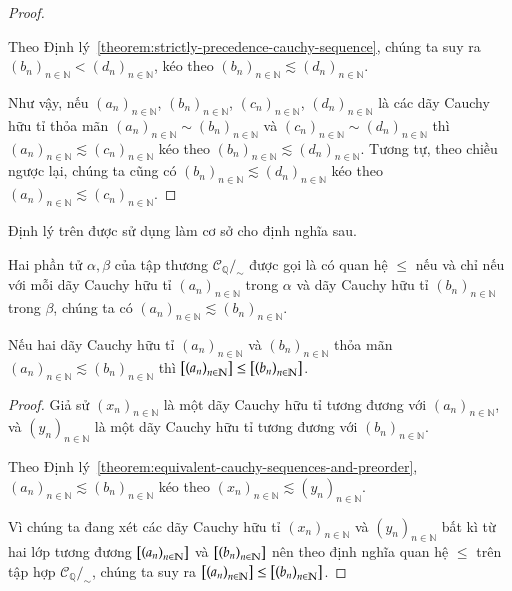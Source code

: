 \begin{proof}
\begin{enumerate}[label={\textbf{Trường hợp \arabic*.}},itemindent=2cm]
              Theo Định lý~\ref{theorem:strictly-precedence-cauchy-sequence}, chúng ta suy ra ${(b_{n})}_{n\in\mathbb{N}} < {(d_{n})}_{n\in\mathbb{N}}$, kéo theo ${(b_{n})}_{n\in\mathbb{N}}\lesssim {(d_{n})}_{n\in\mathbb{N}}$.
    \end{enumerate}

    Như vậy, nếu ${(a_{n})}_{n\in\mathbb{N}}$, ${(b_{n})}_{n\in\mathbb{N}}$, ${(c_{n})}_{n\in\mathbb{N}}$, ${(d_{n})}_{n\in\mathbb{N}}$ là các dãy Cauchy hữu tỉ thỏa mãn ${(a_{n})}_{n\in\mathbb{N}}\sim {(b_{n})}_{n\in\mathbb{N}}$ và ${(c_{n})}_{n\in\mathbb{N}}\sim {(d_{n})}_{n\in\mathbb{N}}$ thì ${(a_{n})}_{n\in\mathbb{N}}\lesssim {(c_{n})}_{n\in\mathbb{N}}$ kéo theo ${(b_{n})}_{n\in\mathbb{N}}\lesssim {(d_{n})}_{n\in\mathbb{N}}$. Tương tự, theo chiều ngược lại, chúng ta cũng có ${(b_{n})}_{n\in\mathbb{N}}\lesssim {(d_{n})}_{n\in\mathbb{N}}$ kéo theo ${(a_{n})}_{n\in\mathbb{N}}\lesssim {(c_{n})}_{n\in\mathbb{N}}$.
\end{proof}

Định lý trên được sử dụng làm cơ sở cho định nghĩa sau.
\begin{definition}
    Hai phần tử $\alpha, \beta$ của tập thương $\mathscr{C}_{\mathbb{Q}}/_{\sim}$ được gọi là có quan hệ $\leq$ nếu và chỉ nếu với mỗi dãy Cauchy hữu tỉ ${(a_{n})}_{n\in\mathbb{N}}$ trong $\alpha$ và dãy Cauchy hữu tỉ ${(b_{n})}_{n\in\mathbb{N}}$ trong $\beta$, chúng ta có ${(a_{n})}_{n\in\mathbb{N}}\lesssim {(b_{n})}_{n\in\mathbb{N}}$.
\end{definition}

\begin{theorem}\label{theorem:preorder-to-order}
    Nếu hai dãy Cauchy hữu tỉ ${(a_{n})}_{n\in\mathbb{N}}$ và ${(b_{n})}_{n\in\mathbb{N}}$ thỏa mãn ${(a_{n})}_{n\in\mathbb{N}}\lesssim {(b_{n})}_{n\in\mathbb{N}}$ thì $\left[{\left({a_{n}}\right)}_{{n}\in\mathbb{N}}\right]\leq \left[{\left({b_{n}}\right)}_{{n}\in\mathbb{N}}\right]$.
\end{theorem}

\begin{proof}
    Giả sử ${(x_{n})}_{n\in\mathbb{N}}$ là một dãy Cauchy hữu tỉ tương đương với ${(a_{n})}_{n\in\mathbb{N}}$, và ${(y_{n})}_{n\in\mathbb{N}}$ là một dãy Cauchy hữu tỉ tương đương với ${(b_{n})}_{n\in\mathbb{N}}$.

    Theo Định lý~\ref{theorem:equivalent-cauchy-sequences-and-preorder}, ${(a_{n})}_{n\in\mathbb{N}}\lesssim {(b_{n})}_{n\in\mathbb{N}}$ kéo theo ${(x_{n})}_{n\in\mathbb{N}}\lesssim {(y_{n})}_{n\in\mathbb{N}}$.

    Vì chúng ta đang xét các dãy Cauchy hữu tỉ ${(x_{n})}_{n\in\mathbb{N}}$ và ${(y_{n})}_{n\in\mathbb{N}}$ bất kì từ hai lớp tương đương $\left[{\left({a_{n}}\right)}_{{n}\in\mathbb{N}}\right]$ và $\left[{\left({b_{n}}\right)}_{{n}\in\mathbb{N}}\right]$ nên theo định nghĩa quan hệ $\leq$ trên tập hợp $\mathscr{C}_{\mathbb{Q}}/_{\sim}$, chúng ta suy ra $\left[{\left({a_{n}}\right)}_{{n}\in\mathbb{N}}\right]\leq \left[{\left({b_{n}}\right)}_{{n}\in\mathbb{N}}\right]$.
\end{proof}

